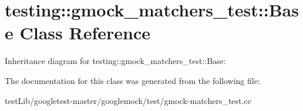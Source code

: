 \hypertarget{classtesting_1_1gmock__matchers__test_1_1Base}{}\section{testing\+:\+:gmock\+\_\+matchers\+\_\+test\+:\+:Base Class Reference}
\label{classtesting_1_1gmock__matchers__test_1_1Base}


Inheritance diagram for testing\+:\+:gmock\+\_\+matchers\+\_\+test\+:\+:Base\+:


The documentation for this class was generated from the following file\+:\begin{DoxyCompactItemize}
\item 
test\+Lib/googletest-\/master/googlemock/test/gmock-\/matchers\+\_\+test.\+cc\end{DoxyCompactItemize}
